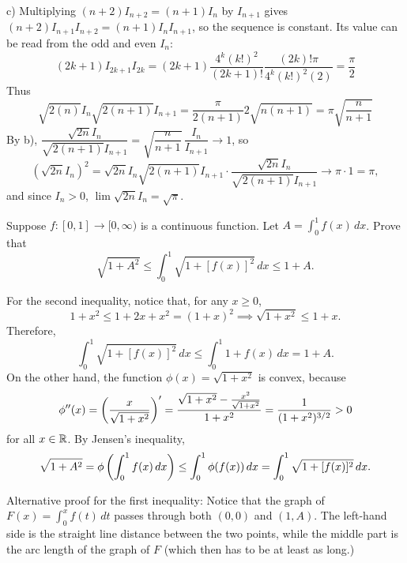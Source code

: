 \begin{problem}
\begin{solution}
    c) Multiplying $(n+2)I_{n+2}=(n+1)I_n$ by $I_{n+1}$ gives $(n+2)I_{n+1}I_{n+2}=(n+1)I_nI_{n+1}$, so the sequence is constant. Its value can be read from the odd and even $I_n$: 
    \[(2k+1)I_{2k+1}I_{2k}= (2k+1)\frac{4^k (k!)^2}{(2k+1)!}\frac{(2k)!\pi}{4^k (k!)^2 (2)}= \frac{\pi}{2}\]
    Thus 
    \[ \sqrt{2(n)}I_n \sqrt{2(n+1)}I_{n+1} = \frac{\pi}{2(n+1)}2\sqrt{n(n+1)}= \pi \sqrt{\frac{n}{n+1}}\]
    By b), $\dfrac{\sqrt{2n}I_n}{\sqrt{2(n+1)}I_{n+1}} = \sqrt{\dfrac{n}{n+1}}\,\dfrac{I_n}{I_{n+1}} \to 1$, so
    \[ \left(\sqrt{2n}I_n\right)^2 = \sqrt{2n}I_n \sqrt{2(n+1)}I_{n+1}\cdot \frac{\sqrt{2n}I_n}{\sqrt{2(n+1)}I_{n+1}} \to \pi\cdot 1 = \pi, \]
    and since $I_n>0$, $\lim \sqrt{2n}I_n =\sqrt{\pi}$.
\end{solution}
\end{problem}

\begin{problem}
Suppose $f: [0,1] \to [0, \infty)$ is a continuous function. Let $A = \int_0^1 f(x) \,dx$. Prove that
$$ \sqrt{1 + A^2} \leq \int_0^1 \sqrt{1 + [f(x)]^2} \,dx \leq 1 + A. $$
\begin{solution}
For the second inequality, notice that, for any $x \geq 0$,
$$ 1 + x^2 \leq 1 + 2x + x^2 = (1 + x)^2 \implies \sqrt{1 + x^2} \leq 1 + x. $$
Therefore,
$$ \int_0^1 \sqrt{1 + [f(x)]^2} \,dx \leq \int_0^1 1 + f(x) \,dx = 1 + A. $$
On the other hand, the function $\phi(x) = \sqrt{1 + x^2}$ is convex, because
$$ \phi''(x) = \left( \frac{x}{\sqrt{1 + x^2}}\right)' = \frac{\sqrt{1 + x^2} - \frac{x^2}{\sqrt{1 + x^2}}}{1 + x^2} = \frac{1}{(1 + x^2)^{3/2}} > 0 $$
for all $x \in \mathbb{R}$. By Jensen's inequality,
$$ \sqrt{1 + A^2} = \phi\left( \int_0^1 f(x) \,dx\right) \leq \int_0^1 \phi(f(x)) \,dx = \int_0^1 \sqrt{1 + [f(x)]^2} \,dx. $$

Alternative proof for the first inequality: Notice that the graph of $F(x) = \int_0^x f(t) \,dt$ passes through both $(0,0)$ and $(1,A)$. The left-hand side is the straight line distance between the two points, while the middle part is the arc length of the graph of $F$ (which then has to be at least as long.)
\end{solution}
\end{problem}

